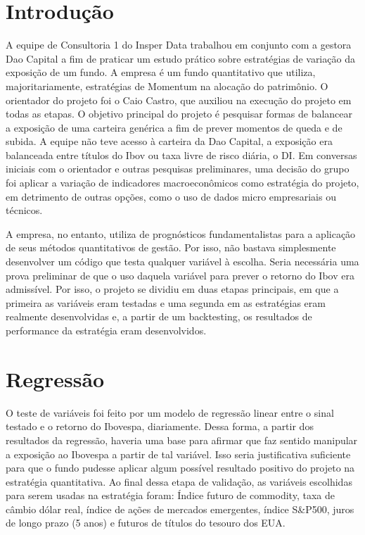 \section{Introdução}

A equipe de Consultoria 1 do Insper Data trabalhou em conjunto com a gestora Dao Capital a fim de praticar um estudo prático sobre estratégias de variação da exposição de um fundo. A empresa é um fundo quantitativo que utiliza, majoritariamente, estratégias de Momentum na alocação do patrimônio. O orientador do projeto foi o Caio Castro, que auxiliou na execução do projeto em todas as etapas.
O objetivo principal do projeto é pesquisar formas de balancear a exposição de uma carteira genérica a fim de prever momentos de queda e de subida. A equipe não teve acesso à carteira da Dao Capital, a exposição era balanceada entre títulos do Ibov ou taxa livre de risco diária, o DI. Em conversas iniciais com o orientador e outras pesquisas preliminares, uma decisão do grupo foi aplicar a variação de indicadores macroeconômicos como estratégia do projeto, em detrimento de outras opções, como o uso de dados micro empresariais ou técnicos.

A empresa, no entanto, utiliza de prognósticos fundamentalistas para a aplicação de seus métodos quantitativos de gestão. Por isso, não bastava simplesmente desenvolver um código que testa qualquer variável à escolha. Seria necessária uma prova preliminar de que o uso daquela variável para prever o retorno do Ibov era admissível. Por isso, o projeto se dividiu em duas etapas principais, em que a primeira as variáveis eram testadas e uma segunda em as estratégias eram realmente desenvolvidas e, a partir de um backtesting, os resultados de performance da estratégia eram desenvolvidos. 

\section{Regressão}

O teste de variáveis foi feito por um modelo de regressão linear entre o sinal testado e o retorno do Ibovespa, diariamente. Dessa forma, a partir dos resultados da regressão, haveria uma base para afirmar que faz sentido manipular a exposição ao Ibovespa a partir de tal variável. Isso seria justificativa suficiente para que o fundo pudesse aplicar algum possível resultado positivo do projeto na estratégia quantitativa.
Ao final dessa etapa de validação, as variáveis escolhidas para serem usadas na estratégia foram: Índice futuro de commodity, taxa de câmbio dólar real, índice de ações de mercados emergentes, índice S\&P500, juros de longo prazo (5 anos) e futuros de títulos do tesouro dos EUA.

